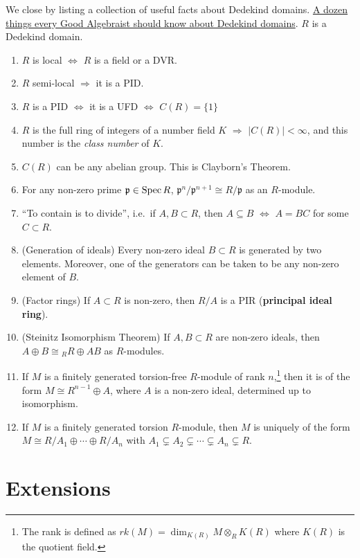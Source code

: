 We close by listing a collection of useful facts about Dedekind domains.
 \underline{A dozen things every Good Algebraist should know about Dedekind domains}. $R$
 is a Dedekind domain.
 \begin{enumerate}
   \item $R$ is local $\Longleftrightarrow$ $R$ is a field or a DVR.
   \item $R$ semi-local $\Longrightarrow$ it is a PID.
   \item $R$ is a PID $\Longleftrightarrow$ it is a UFD $\Longleftrightarrow$ $C(R)=\{1\}$
   \item $R$ is the full ring of integers of a number field $K$ $\Longrightarrow$ $|C(R)|<
   \infty$, and this number is the \emph{class number} of $K$.
   \item $C(R)$ can be any abelian group. This is Clayborn's Theorem.
   \item For any non-zero prime $\mathfrak{p}\in \operatorname{Spec} R$, $\mathfrak{p}^n/\mathfrak{p}^{n+1}\cong R/\mathfrak{p}$ as an
   $R$-module.
   \item ``To contain is to divide'', i.e.~if $A,B\subset R$, then $A\subseteq B$
   $\Longleftrightarrow$ $A=BC$ for some $C\subset R$.
   \item (Generation of ideals) Every non-zero ideal $B\subset R$ is generated by two elements.
   Moreover, one of the generators can be taken to be any non-zero element of $B$.
   \item (Factor rings) If $A\subset R$ is non-zero, then $R/A$ is a PIR
	(\textbf{principal ideal ring}).
   \item (Steinitz Isomorphism Theorem) If $A,B\subset R$ are non-zero ideals, then $A\oplus
   B\cong {}_RR\oplus AB$ as $R$-modules.
   \item If $M$ is a finitely generated torsion-free $R$-module of rank $n$,\footnote{The
   rank is defined as $rk(M)=\dim_{K(R)} M\otimes_R K(R)$ where $K(R)$ is the
	quotient field.} then it is of the
   form $M\cong R^{n-1}\oplus A$, where $A$ is a non-zero ideal, determined up to
   isomorphism.
   \item If $M$ is a finitely generated torsion $R$-module, then $M$ is uniquely of the
   form $M\cong R/A_1\oplus
   \cdots \oplus R/A_n$ with $A_1\subsetneq A_2\subsetneq \cdots \subsetneq
   A_n\subsetneq R$.
    \end{enumerate}


\section{Extensions}


